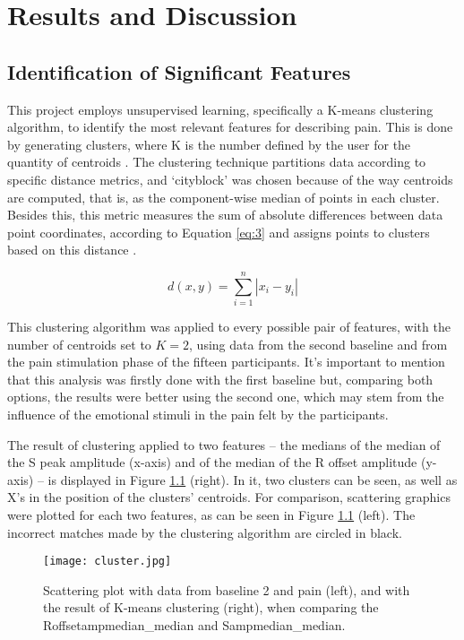 \chapter{Results and Discussion}

\section{Identification of Significant Features}

This project employs unsupervised learning, specifically a K-means clustering algorithm, to identify the most relevant features for describing pain. This is done by generating clusters, where K is the number defined by the user for the quantity of centroids \cite{Ikotun2023}. The clustering technique partitions data according to specific distance metrics, and `cityblock' was chosen because of the way centroids are computed, that is, as the component-wise median of points in each cluster. Besides this, this metric measures the sum of absolute differences between data point coordinates, according to Equation \ref{eq:3} and assigns points to clusters based on this distance \cite{Ricken2023}.

\begin{equation} \label{eq:3}
d(x,y)=\sum_{i=1}^{n}\left| x_i-y_i \right|
\end{equation}

This clustering algorithm was applied to every possible pair of features, with the number of centroids set to $K=2$, using data from the second baseline and from the pain stimulation phase of the fifteen participants. It's important to mention that this analysis was firstly done with the first baseline but, comparing both options, the results were better using the second one, which may stem from the influence of the emotional stimuli in the pain felt by the participants.

The result of clustering applied to two features -- the medians of the median of the S peak amplitude (x-axis) and of the median of the R offset amplitude (y-axis) -- is displayed in Figure \ref{fig:cluster} (right). In it, two clusters can be seen, as well as X's in the position of the clusters' centroids.
For comparison, scattering graphics were plotted for each two features, as can be seen in Figure \ref{fig:cluster} (left). The incorrect matches made by the clustering algorithm are circled in black.

\begin{figure}[h!]
    \centering
    \texttt{[image: cluster.jpg]}
    \caption{Scattering plot with data from baseline 2 and pain (left), and with the result of K-means clustering (right), when comparing the Roffsetampmedian\_median and Sampmedian\_median.}
    \label{fig:cluster}
\end{figure}

